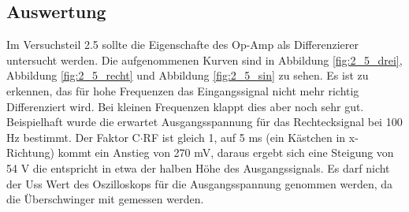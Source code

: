\documentclass[12pt,a4paper]{article}
\begin{document}
\subsection{Auswertung}

Im Versuchsteil 2.5 sollte die Eigenschafte des Op-Amp als Differenzierer untersucht werden. Die aufgenommenen Kurven sind in Abbildung \ref{fig:2_5_drei}, Abbildung \ref{fig:2_5_recht} und Abbildung \ref{fig:2_5_sin} zu sehen. Es ist zu erkennen, das für hohe Frequenzen das Eingangssignal nicht mehr richtig Differenziert wird. Bei kleinen Frequenzen klappt dies aber noch sehr gut. Beispielhaft wurde die erwartet Ausgangsspannung für das Rechtecksignal bei 100 Hz bestimmt. Der Faktor C$\cdot$RF ist gleich 1, auf 5 ms (ein Kästchen in x-Richtung) kommt ein Anstieg von 270 mV, daraus ergebt sich eine Steigung von 54 V die entspricht in etwa der halben Höhe des Ausgangssignals. Es darf nicht der Uss Wert des Oszilloskops für die Ausgangsspannung genommen werden, da die Überschwinger mit gemessen werden.
\end{document}
